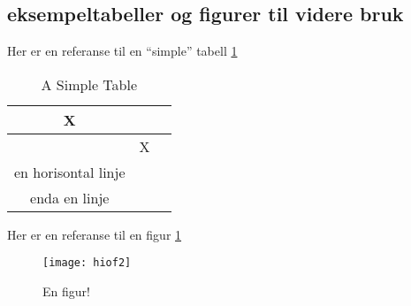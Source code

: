 \subsection{eksempeltabeller og figurer til videre bruk}
\label{subsec:eksempel}

Her er en referanse til en ``simple'' tabell \ref{tab:simple}
\begin{table}[!h]
\centering
\begin{tabular}{c|c|c}
X & & \\
\hline
& X & \\
\hline
en horisontal linje & & \\
\hline
enda en linje & & \\
\end{tabular}
\caption{A Simple Table}
\label{tab:simple}
\end{table}

Her er en referanse til en figur \ref{fig:hiof}

\begin{figure}[!h]
	\begin{center}
	\label{fig:hiof}
    \texttt{[image: hiof2]}
	\end{center}
	\caption{En figur!}
\end{figure}
